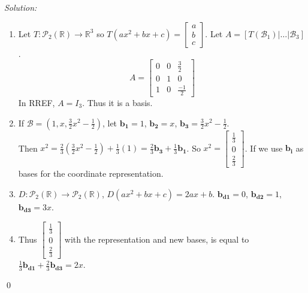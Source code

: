 \documentclass[12 pt]{article}
\newenvironment{sol}
    {\emph{Solution:}
    }
    {
    \qed
    }
\theoremstyle{definition}
\newcommand{\R}{\mathbb{R}} %
\newcommand{\poly}[2]{\mathscr{P}_#2(#1)}
\newcommand{\vo}[1]{\mathbf{#1}}
\begin{document}
\begin{sol}
\begin{enumerate}[label=(\alph*)]
    \item Let $T: \poly{\R}{2}\to \R^3$ so $T(ax^2+bx+c)=\begin{bmatrix}
    a\\b\\c
    \end{bmatrix}$. Let $A=[T(\mathscr{B_1})|\dots|\mathscr{B_3}]$.
    \[A=\begin{bmatrix}
    0 & 0 & \frac{3}{2}\\
    0 & 1 & 0\\
    1 & 0 & \frac{-1}{2}
    \end{bmatrix}\]
    \newcommand{\vb}[1]{\vo{b_{#1}}}
    In RREF, $A=I_3$. Thus it is a basis.
    \item If $\mathscr{B}=(1,x,\frac{3}{2}x^2-\frac{1}{2})$, let $\vb{1}=1$, $\vb{2}=x$, $\vb{3}=\frac{3}{2}x^2-\frac{1}{2}$.\\
    Then $x^2=\frac{2}{3}(\frac{3}{2}x^2-\frac{1}{2})+\frac{1}{3}(1)=\frac{2}{3}\vb{3}+\frac{1}{3}\vb{1}$. So $x^2 = \begin{bmatrix}
    \frac{1}{3 }\\0\\\frac{2}{3}
    \end{bmatrix}$. If we use $\vb{i}$ as bases for the coordinate representation.
    \item $D:\poly{\R}{2}\to\poly{\R}{2}$, $D(ax^2+bx+c) = 2ax+b$. $\vb{d1}=0$, $\vb{d2}=1$, $\vb{d3}=3x$.
    \item Thus $\begin{bmatrix}
    \frac{1}{3 }\\0\\\frac{2}{3}
    \end{bmatrix}$ with the representation and new bases, is equal to $\frac{1}{3}\vb{d1}+\frac{2}{3}\vb{d3}=2x$.
\end{enumerate}
\end{sol}
\end{document}
